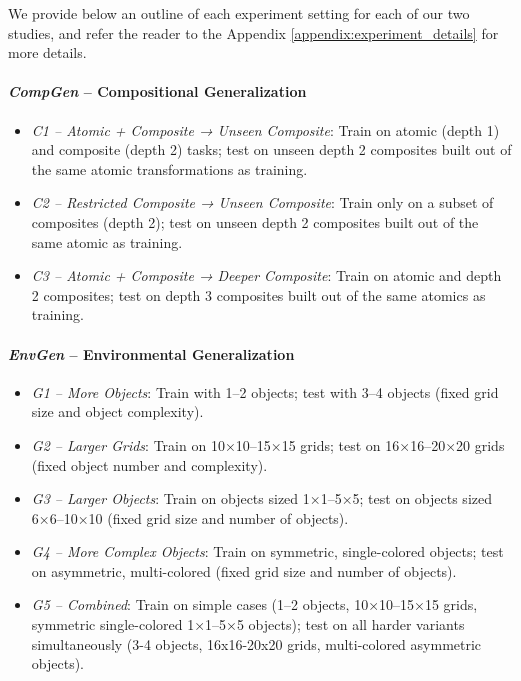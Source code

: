 We provide below an outline of each experiment setting for each of our two studies, and refer the reader to the Appendix \ref{appendix:experiment_details} for more details.

\newpage
\paragraph{\textit{CompGen} – Compositional Generalization}
    \begin{itemize}
        \item \textit{C1 – Atomic + Composite → Unseen Composite}: Train on atomic (depth 1) and composite (depth 2) tasks; test on unseen depth 2 composites built out of the same atomic transformations as training.
        \item \textit{C2 – Restricted Composite → Unseen Composite}: Train only on a subset of composites (depth 2); test on unseen depth 2 composites built out of the same atomic as training.
        \item \textit{C3 – Atomic + Composite → Deeper Composite}: Train on atomic and depth 2 composites; test on depth 3 composites built out of the same atomics as training.
    \end{itemize}

\paragraph{\textit{EnvGen} – Environmental Generalization}
\begin{itemize}
    \item \textit{G1 – More Objects}: Train with 1–2 objects; test with 3–4 objects (fixed grid size and object complexity).
    \item \textit{G2 – Larger Grids}: Train on 10×10–15×15 grids; test on 16×16–20×20 grids (fixed object number and complexity).
    \item \textit{G3 – Larger Objects}: Train on objects sized 1×1–5×5; test on objects sized 6×6–10×10 (fixed grid size and number of objects).
    \item \textit{G4 – More Complex Objects}: Train on symmetric, single-colored objects; test on asymmetric, multi-colored (fixed grid size and number of objects).
    \item \textit{G5 – Combined}: Train on simple cases (1–2 objects, 10×10–15×15 grids, symmetric single-colored 1×1–5×5 objects); test on all harder variants simultaneously (3-4 objects, 16x16-20x20 grids, multi-colored asymmetric objects).
\end{itemize}


